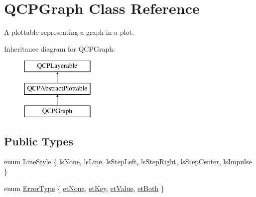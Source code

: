 \hypertarget{classQCPGraph}{\section{\-Q\-C\-P\-Graph \-Class \-Reference}
\label{classQCPGraph}
}


\-A plottable representing a graph in a plot.  


\-Inheritance diagram for \-Q\-C\-P\-Graph\-:\begin{figure}[H]
\begin{center}
\leavevmode
\includegraphics[height=3.000000cm]{classQCPGraph}
\end{center}
\end{figure}
\subsection*{\-Public \-Types}
\begin{DoxyCompactItemize}
\item 
enum \hyperlink{classQCPGraph_ad60175cd9b5cac937c5ee685c32c0859}{\-Line\-Style} \{ \*
\hyperlink{classQCPGraph_ad60175cd9b5cac937c5ee685c32c0859aea9591b933733cc7b20786b71e60fa04}{ls\-None}, 
\hyperlink{classQCPGraph_ad60175cd9b5cac937c5ee685c32c0859a3c42a27b15aa3c92d399082fad8b7515}{ls\-Line}, 
\hyperlink{classQCPGraph_ad60175cd9b5cac937c5ee685c32c0859ae10568bda57836487d9dec5eba1d6c6e}{ls\-Step\-Left}, 
\hyperlink{classQCPGraph_ad60175cd9b5cac937c5ee685c32c0859a9c37951f7d11aa070100fd16f2935c9e}{ls\-Step\-Right}, 
\*
\hyperlink{classQCPGraph_ad60175cd9b5cac937c5ee685c32c0859a5adf7b04da215a40a764c21294ea7366}{ls\-Step\-Center}, 
\hyperlink{classQCPGraph_ad60175cd9b5cac937c5ee685c32c0859aa3b358b4ae7cca94aceeb8e529c12ebb}{ls\-Impulse}
 \}
\item 
enum \hyperlink{classQCPGraph_ad23b514404bd2cb3216f57c90904d6af}{\-Error\-Type} \{ \hyperlink{classQCPGraph_ad23b514404bd2cb3216f57c90904d6afaeae745e7cc1766bb8546e35d4b76a711}{et\-None}, 
\hyperlink{classQCPGraph_ad23b514404bd2cb3216f57c90904d6afa2a5d89cd76fb8b6b18d71b8f6f6c0f43}{et\-Key}, 
\hyperlink{classQCPGraph_ad23b514404bd2cb3216f57c90904d6afa147022ccdc49f6bd48f904cb4f61872e}{et\-Value}, 
\hyperlink{classQCPGraph_ad23b514404bd2cb3216f57c90904d6afa761cb7d61670c1e2efecccd8974409ab}{et\-Both}
 \}
\end{DoxyCompactItemize}
